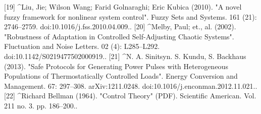 [19]
^Liu, Jie; Wilson Wang; Farid Golnaraghi; Eric Kubica (2010). "A novel fuzzy framework for nonlinear system control". Fuzzy Sets and Systems. 161 (21): 2746–2759. doi:10.1016/j.fss.2010.04.009..
[20]
^Melby, Paul; et., al. (2002). "Robustness of Adaptation in Controlled Self-Adjusting Chaotic Systems". Fluctuation and Noise Letters. 02 (4): L285–L292. doi:10.1142/S0219477502000919..
[21]
^N. A. Sinitsyn. S. Kundu, S. Backhaus (2013). "Safe Protocols for Generating Power Pulses with Heterogeneous Populations of Thermostatically Controlled Loads". Energy Conversion and Management. 67: 297–308. arXiv:1211.0248. doi:10.1016/j.enconman.2012.11.021..
[22]
^Richard Bellman (1964). "Control Theory" (PDF). Scientific American. Vol. 211 no. 3. pp. 186–200..